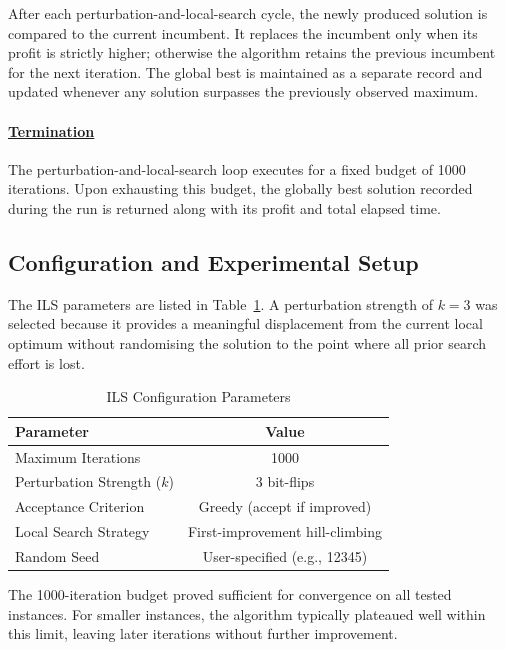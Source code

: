 \documentclass[12pt, a4paper]{article}
\begin{document}
After each perturbation-and-local-search cycle, the newly produced solution is compared to the current incumbent. It replaces the incumbent only when its profit is strictly higher; otherwise the algorithm retains the previous incumbent for the next iteration. The global best is maintained as a separate record and updated whenever any solution surpasses the previously observed maximum.

\paragraph*{\underline{Termination}}

The perturbation-and-local-search loop executes for a fixed budget of 1000 iterations. Upon exhausting this budget, the globally best solution recorded during the run is returned along with its profit and total elapsed time.

\subsection{Configuration and Experimental Setup}

The ILS parameters are listed in Table~\ref{tab:ils_config}. A perturbation strength of $k = 3$ was selected because it provides a meaningful displacement from the current local optimum without randomising the solution to the point where all prior search effort is lost.

\vspace{0.5em}
\begin{table}[ht]
    \centering
    \begin{tabular}{lc}
        \toprule
        \textbf{Parameter} & \textbf{Value} \\
        \midrule
        Maximum Iterations          & 1000 \\
        Perturbation Strength ($k$) & 3 bit-flips \\
        Acceptance Criterion        & Greedy (accept if improved) \\
        Local Search Strategy       & First-improvement hill-climbing \\
        Random Seed                 & User-specified (e.g., 12345) \\
        \bottomrule
    \end{tabular}
    \caption{ILS Configuration Parameters}
    \label{tab:ils_config}
\end{table}

The 1000-iteration budget proved sufficient for convergence on all tested instances. For smaller instances, the algorithm typically plateaued well within this limit, leaving later iterations without further improvement.
\end{document}
